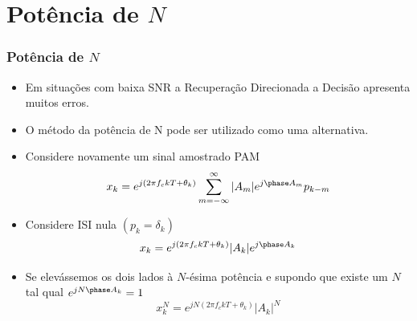 \section{Potência de $N$}

\begin{frame}
	\frametitle{Potência de $N$}
	\begin{itemize}
		
		\item Em situações com baixa SNR a Recuperação Direcionada a Decisão apresenta muitos erros.
		
		\item O método da potência de N pode ser utilizado como uma alternativa.
		
		\item Considere novamente um sinal amostrado PAM 
			\begin{equation*}
			x_k=e^{j(2\pi f_ckT +\theta_k)}\sum_{m=-\infty}^{\infty}|A_m|e^{j\phase A_m}p_{k-m}
			\end{equation*}
		\item Considere ISI nula $(p_k=\delta_k)$
		\begin{equation*}
		x_k=e^{j(2\pi f_ckT +\theta_k)}|A_k|e^{j\phase A_k}
		\end{equation*}
		
		\item Se elevássemos os dois lados à $N$-ésima potência e supondo que existe um $N$ tal qual $e^{jN \phase A_k}=1$
		\begin{equation*}
		x_{k}^N=e^{jN(2\pi f_ckT +\theta_k)}|A_k|^N
		\end{equation*}
			
	\end{itemize}
	
\end{frame}

